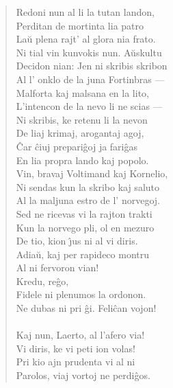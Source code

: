 \begin{verse}
                Redoni nun al li la tutan landon,\\
                Perditan de mortinta lia patro\\
                La\u u plena rajt' al glora nia frato.\\
                Ni tial vin kunvokis nun. A\u uskultu\\
                Decidon nian: Jen ni skribis skribon\\
                Al l' onklo de la juna Fortinbras ---\\
                Malforta kaj malsana en la lito,\\
                L'intencon de la nevo li ne scias ---\\
                Ni skribis, ke retenu li la nevon\\
                De liaj krimaj, arogantaj agoj,\\
                \^Car ĉiuj prepari\^goj ja fari\^gas\\
                En lia propra lando kaj popolo.\\
                Vin, bravaj Voltimand kaj Kornelio,\\
                Ni sendas kun la skribo kaj saluto\\
                Al la maljuna estro de l' norvegoj.\\
                Sed ne ricevas vi la rajton trakti\\
                Kun la norvego pli, ol en mezuro\\
                De tio, kion \^{\j}us ni al vi diris.\\
                Adia\u u, kaj per rapideco montru\\
                Al ni fervoron vian!\\
 Kredu, reĝo,\\
                              Fidele ni plenumos la ordonon.\\
 Ne dubas ni pri \^gi. Feli\^can vojon!\\
\\
                Kaj nun, Laerto, al l'afero via!\\
                Vi diris, ke vi peti ion volas!\\
                Pri kio ajn prudenta vi al ni\\
                Parolos, viaj vortoj ne perdi\^gos.\\

\end{verse}
